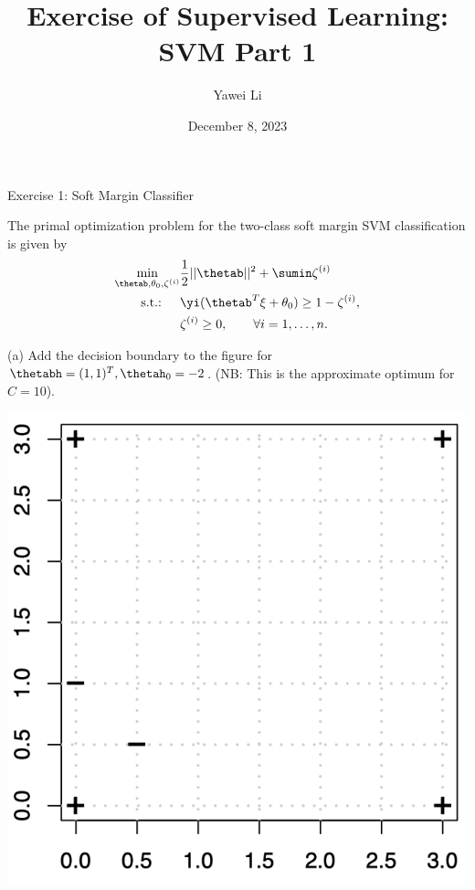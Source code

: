 \documentclass[aspectratio=169]{beamer}
\title[]{\textbf{Exercise of Supervised Learning: \\ SVM Part 1}}
\author{Yawei Li}
\institute[LMU]
{
\\
  \texttt{yawei.li@stat.uni-muenchen.de}
}
\date{December 8, 2023}
\newcommand{\zetai}{\zeta^{(i)}}
\begin{document}
\begin{frame}
\titlepage

\end{frame}

\begin{frame}{Exercise 1: Soft Margin Classifier}

The primal optimization problem for the two-class soft margin SVM classification is given by 
\begin{align*}
	\min_{\thetab, \theta_0, \zetai} & \frac{1}{2} ||\thetab||^2 + \sumin \zetai \\	
	\text{s.t.: }\quad & \yi (\thetab^T \xi + \theta_0) \geq 1 - \zetai, \\
	& \zetai \geq 0, \qquad \forall i= 1, \ldots, n.
\end{align*}

\begin{adjustbox}{valign=t}
	\begin{minipage}[t]{0.49\textwidth}
		(a) Add the decision boundary to the figure for $\thetabh = (1, 1)^T, \thetah_0 = -2$. (NB: This is the approximate optimum for $C = 10$).
	\end{minipage}
\end{adjustbox}
\hfill
\begin{adjustbox}{valign=t}
	\begin{minipage}{0.49\textwidth}
		\centering
		\includegraphics[width=0.6\columnwidth]{figures/ex_1_question.png}
	\end{minipage}

\end{adjustbox}

\end{frame}
\end{document}
